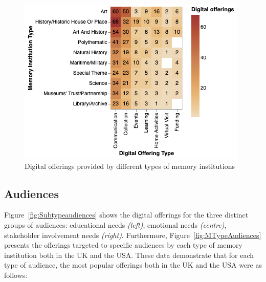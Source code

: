 \documentclass{egpubl}
\begin{document}
\begin{figure}[h]
  \centering
  \includegraphics[width=\linewidth]{images/museumoffering.png}
  \caption{\label{fig:MTypeOfferings}
           Digital offerings provided by different types of memory institutions}
\end{figure}






\subsection{Audiences}
\label{aud}
Figure~\ref{fig:Subtypeaudiences} shows the digital offerings for the three distinct groups of audiences: educational needs  \emph{(left)}, emotional needs \emph{(centre)}, stakeholder involvement needs \emph{(right)}. Furthermore, Figure~\ref{fig:MTypeAudiences} presents the offerings targeted to specific audiences by each type of memory institution both in the UK and the USA. These data demonstrate that for each type of audience, the most popular offerings both in the UK and the USA were as follows:
\end{document}
